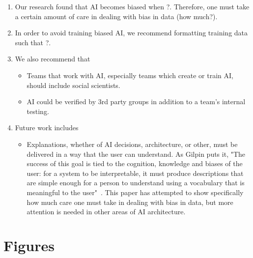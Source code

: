 \documentclass{report}
\begin{document}
\begin{enumerate}
    \item Our research found that AI becomes biased when ?. Therefore, one must take a certain
    amount of care in dealing with bias in data (how much?).
    
    \item In order to avoid training biased AI, we recommend formatting training data such that ?.
    
    \item We also recommend that
    \begin{itemize}
        \item Teams that work with AI, especially teams which create or train AI, should include
        social scientists.
        
        \item AI could be verified by 3rd party groups in addition to a team's internal testing.
    \end{itemize}

    \item Future work includes
    \begin{itemize}
        \item Explanations, whether of AI decisions, architecture, or other, must be delivered in a
        way that the user can understand. As Gilpin puts it, "The success of this goal is tied to
        the cognition, knowledge and biases of the user: for a system to be interpretable, it must
        produce descriptions that are simple enough for a person to understand using a vocabulary
        that is meaningful to the user"~\cite{gilpin2018explaining}. This paper has attempted to
        show specifically how much care one must take in dealing with bias in data, but more
        attention is needed in other areas of AI architecture.
    \end{itemize}
\end{enumerate}




\appendix
\chapter{Figures}
\end{document}

